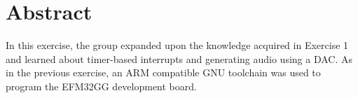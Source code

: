 \chapter*{Abstract}


In this exercise, the group expanded upon the knowledge acquired in Exercise 1 \cite{exercise1report} and learned about timer-based interrupts and generating audio using a DAC. As in the previous exercise, an ARM compatible GNU toolchain was used to program the EFM32GG development board.
